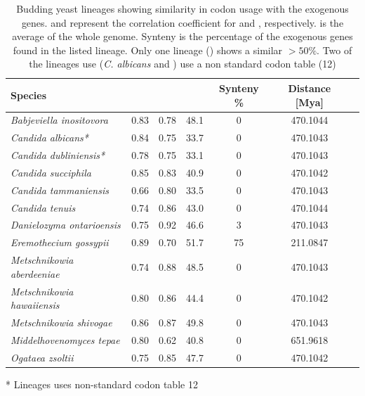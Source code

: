 \documentclass[fleqn,letterpaper]{article}
\begin{document}
\begin{table}
  \centering
  \caption{Budding yeast lineages showing similarity in codon usage with the exogenous genes.
  \DM and \DE represent the correlation coefficient for \DM and \DE, respectively.
  \GC is the average \GC of the whole genome.
  Synteny is the percentage of the exogenous genes found in the listed lineage.
  Only one lineage (\gossypii) shows a similar \GC $> 50 \%$. 
  Two of the lineages use (\textit{C. albicans} and \dubl) use a non standard codon table (12)}
  \begin{threeparttable}
  	\begin{tabular}{lcccccc}
    		\hline
    		Species & \DM & \DE & \GC & Synteny \%&  Distance [Mya] \\ \hline 
    		\emph{Babjeviella inositovora}			& 0.83 & 0.78 & 48.1 & 0   & 470.1044 \\
    		\emph{Candida albicans*}		   		& 0.84 & 0.75 & 33.7 & 0   & 470.1043 \\
   		\emph{Candida dubliniensis*}               		& 0.78 & 0.75 & 33.1 & 0   & 470.1043 \\ 
    		\emph{Candida succiphila}	       			& 0.85 & 0.83 & 40.9 & 0   & 470.1042 \\ 
    		\emph{Candida tammaniensis}			& 0.66 & 0.80 & 33.5 & 0   & 470.1043 \\
    		\emph{Candida tenuis}					& 0.74 & 0.86 & 43.0 & 0   & 470.1044 \\
    		\emph{Danielozyma ontarioensis}			& 0.75 & 0.92 & 46.6 & 3   & 470.1043 \\
    		\emph{Eremothecium gossypii}			& 0.89 & 0.70 & 51.7 & 75 & 211.0847 \\
    		\emph{Metschnikowia aberdeeniae}		& 0.74 & 0.88 & 48.5 & 0   & 470.1043 \\
    		\emph{Metschnikowia hawaiiensis}		& 0.80 & 0.86 & 44.4 & 0   & 470.1042 \\
    		\emph{Metschnikowia shivogae}			& 0.86 & 0.87 & 49.8 & 0   & 470.1043 \\
    		\emph{Middelhovenomyces tepae}		& 0.80 & 0.62 & 40.8 & 0   & 651.9618 \\ 
    		\emph{Ogataea zsoltii}					& 0.75 & 0.85 & 47.7 & 0   & 470.1042 \\ \hline
  	\end{tabular}
  	\begin{tablenotes}
    		\item[*] Lineages uses non-standard codon table 12
 	 \end{tablenotes}
  \end{threeparttable}  
  \label{tab:source}
\end{table}
\end{document}
